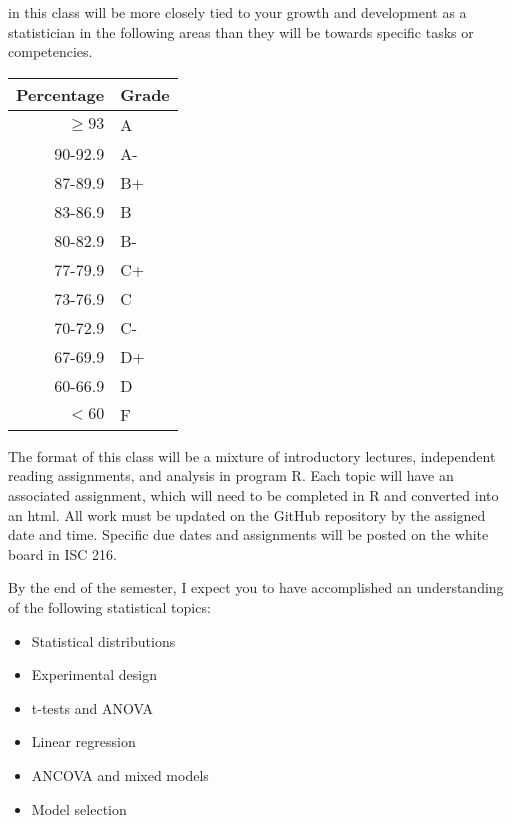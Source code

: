 \documentclass{tufte-handout}
\begin{document}

 in this class will be more closely tied to your growth and development as a statistician in the following areas than they will be towards specific tasks or competencies. 

\begin{margintable}
\begin{tabular}{rl}
Percentage & Grade \\
\hline 
$\ge93$ & A \\
90-92.9 & A- \\
87-89.9 & B+ \\
83-86.9 & B \\
80-82.9 & B- \\
77-79.9 & C+ \\
73-76.9 & C \\
70-72.9 & C- \\
67-69.9 & D+ \\
60-66.9 & D \\
$<60$ & F \\
\hline
\end{tabular}
\end{margintable}

The format of this class will be a mixture of introductory lectures, independent reading assignments, and analysis in program R. Each topic will have an associated assignment, which will need to be completed in R and converted into an html. All work must be updated on the GitHub repository by the assigned date and time. Specific due dates and assignments will be posted on the white board in ISC 216.

By the end of the semester, I expect you to have accomplished an understanding of the following statistical topics:

\begin{itemize}
	\item Statistical distributions
	\item Experimental design
	\item t-tests and ANOVA
	\item Linear regression
	\item ANCOVA and mixed models
	\item Model selection
\end{itemize}
\end{document}
